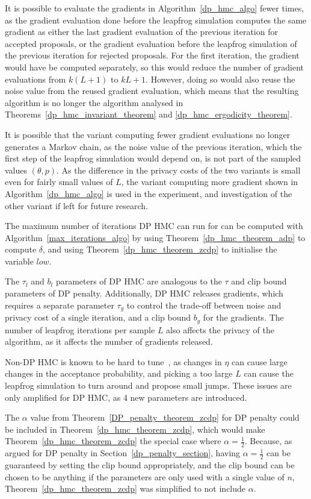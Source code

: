 \documentclass[english,twoside,openright]{HYgraduMLDS}
\begin{document}
It is possible to evaluate the gradients in Algorithm~\ref{dp_hmc_algo} fewer
times, as the gradient evaluation done before the leapfrog simulation computes
the same gradient as either the last gradient evaluation of the previous iteration
for accepted proposals, or the gradient evaluation before the leapfrog simulation
of the previous iteration for rejected proposals. For the first iteration, the
gradient would have be computed separately, so this would reduce the number of
gradient evaluations from \(k(L + 1)\) to \(kL + 1\). However, doing so would
also reuse the noise value from the reused gradient evaluation, which means that
the resulting algorithm is no longer the algorithm analysed in
Theorems~\ref{dp_hmc_invariant_theorem} and \ref{dp_hmc_ergodicity_theorem}.

It is possible that the variant computing fewer gradient evaluations no longer
generates a Markov chain, as the noise value of the previous iteration, which
the first step of the leapfrog simulation would depend on, is not
part of the sampled values \((\theta, p)\). As the difference in the privacy
costs of the two variants is small even for fairly small values of \(L\),
the variant computing more gradient shown in Algorithm~\ref{dp_hmc_algo}
is used in the experiment, and investigation of the other variant if left
for future research.

The maximum number of iterations DP HMC can run for can be computed with
Algorithm~\ref{max_iterations_algo} by using Theorem~\ref{dp_hmc_theorem_adp}
to compute \(\delta\), and using Theorem~\ref{dp_hmc_theorem_zcdp}
to initialise the variable \(low\).

The \(\tau_{l}\) and \(b_{l}\) parameters of DP HMC are analogous to the
\(\tau\) and clip bound parameters of DP penalty. Additionally, DP HMC
releases gradients, which requires a separate parameter \(\tau_{g}\) to
control the trade-off between noise and privacy cost of a single iteration,
and a clip bound \(b_{g}\) for the gradients. The number of leapfrog iterations
per sample \(L\) also affects the privacy of the algorithm, as it affects the
number of gradients released.

Non-DP HMC is known to be hard to tune~\cite{neal2012mcmc},
as changes in \(\eta\) can cause large changes in the acceptance probability,
and picking a too large \(L\) can cause the leapfrog simulation to turn
around and propose small jumps. These issues are only amplified for DP HMC,
as 4 new parameters are introduced.

The \(\alpha\) value from Theorem~\ref{DP_penalty_theorem_zcdp} for
DP penalty could be included in Theorem~\ref{dp_hmc_theorem_zcdp},
which would make Theorem~\ref{dp_hmc_theorem_zcdp} the special case where
\(\alpha = \frac{1}{2}\). Because, as argued for DP penalty in
Section~\ref{dp_penalty_section}, having \(\alpha = \frac{1}{2}\) can be
guaranteed by setting the clip bound appropriately, and the clip bound can
be chosen to be anything if the parameters are only used with a single value
of \(n\),
Theorem~\ref{dp_hmc_theorem_zcdp} was simplified to not include \(\alpha\).
\end{document}
